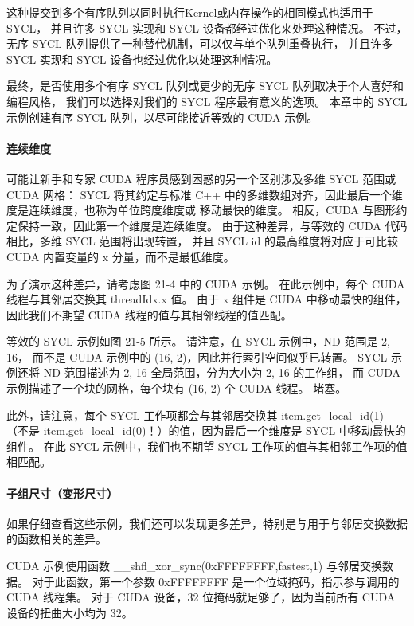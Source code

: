 这种提交到多个有序队列以同时执行Kernel或内存操作的相同模式也适用于 SYCL，
并且许多 SYCL 实现和 SYCL 设备都经过优化来处理这种情况。 
不过，无序 SYCL 队列提供了一种替代机制，可以仅与单个队列重叠执行，
并且许多 SYCL 实现和 SYCL 设备也经过优化以处理这种情况。

最终，是否使用多个有序 SYCL 队列或更少的无序 SYCL 队列取决于个人喜好和编程风格，
我们可以选择对我们的 SYCL 程序最有意义的选项。 
本章中的 SYCL 示例创建有序 SYCL 队列，以尽可能接近等效的 CUDA 示例。

\paragraph{连续维度}

可能让新手和专家 CUDA 程序员感到困惑的另一个区别涉及多维 SYCL 范围或 CUDA 网格：
SYCL 将其约定与标准 C++ 中的多维数组对齐，因此最后一个维度是连续维度，也称为单位跨度维度或 移动最快的维度。 
相反，CUDA 与图形约定保持一致，因此第一个维度是连续维度。 
由于这种差异，与等效的 CUDA 代码相比，多维 SYCL 范围将出现转置，
并且 SYCL id 的最高维度将对应于可比较 CUDA 内置变量的 x 分量，而不是最低维度。

为了演示这种差异，请考虑图 21-4 中的 CUDA 示例。 
在此示例中，每个 CUDA 线程与其邻居交换其 threadIdx.x 值。 
由于 x 组件是 CUDA 中移动最快的组件，因此我们不期望 CUDA 线程的值与其相邻线程的值匹配。

等效的 SYCL 示例如图 21-5 所示。 请注意，在 SYCL 示例中，ND 范围是 {2, 16}，
而不是 CUDA 示例中的 (16, 2)，因此并行索引空间似乎已转置。 
SYCL 示例还将 ND 范围描述为 {2, 16} 全局范围，分为大小为 {2, 16} 的工作组，
而 CUDA 示例描述了一个块的网格，每个块有 (16, 2) 个 CUDA 线程。 堵塞。

此外，请注意，每个 SYCL 工作项都会与其邻居交换其 item.get\_local\_id(1)
（不是 item.get\_local\_id(0)！）的值，因为最后一个维度是 SYCL 中移动最快的组件。 
在此 SYCL 示例中，我们也不期望 SYCL 工作项的值与其相邻工作项的值相匹配。

\paragraph{子组尺寸（变形尺寸）}

如果仔细查看这些示例，我们还可以发现更多差异，特别是与用于与邻居交换数据的函数相关的差异。

CUDA 示例使用函数 \_\_shfl\_xor\_sync(0xFFFFFFFF,fastest,1) 与邻居交换数据。 
对于此函数，第一个参数 0xFFFFFFFF 是一个位域掩码，指示参与调用的 CUDA 线程集。 
对于 CUDA 设备，32 位掩码就足够了，因为当前所有 CUDA 设备的扭曲大小均为 32。

